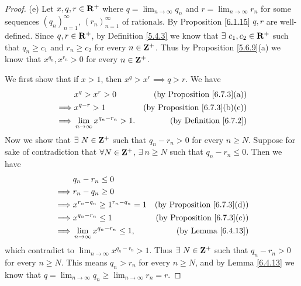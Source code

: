 \begin{proof}{(e)}
    Let \(x, q, r \in \mathbf{R}^+\) where \(q = \lim_{n \to \infty} q_n\) and \(r = \lim_{n \to \infty} r_n\) for some sequences \((q_n)_{n = 1}^\infty\), \((r_n)_{n = 1}^\infty\) of rationals.
    By Proposition \ref{6.1.15} \(q, r\) are well-defined.
    Since \(q, r \in \mathbf{R}^+\), by Definition \ref{5.4.3} we know that \(\exists\ c_1, c_2 \in \mathbf{R}^+\) such that \(q_n \geq c_1\) and \(r_n \geq c_2\) for every \(n \in \mathbf{Z}^+\).
    Thus by Proposition \ref{5.6.9}(a) we know that \(x^{q_n}, x^{r_n} > 0\) for every \(n \in \mathbf{Z}^+\).

    We first show that if \(x > 1\), then \(x^q > x^r \implies q > r\).
    We have
    \begin{align*}
                 & x^q > x^r > 0                          & \text{(by Proposition \ref{6.7.3}(a))}    \\
        \implies & x^{q - r} > 1                          & \text{(by Proposition \ref{6.7.3}(b)(c))} \\
        \implies & \lim_{n \to \infty} x^{q_n - r_n} > 1. & \text{(by Definition \ref{6.7.2})}        \\
    \end{align*}
    Now we show that \(\exists\ N \in \mathbf{Z}^+\) such that \(q_n - r_n > 0\) for every \(n \geq N\).
    Suppose for sake of contradiction that \(\forall N \in \mathbf{Z}^+\), \(\exists\ n \geq N\) such that \(q_n - r_n \leq 0\).
    Then we have
    \begin{align*}
                 & q_n - r_n \leq 0                                                                   \\
        \implies & r_n - q_n \geq 0                                                                   \\
        \implies & x^{r_n - q_n} \geq 1^{r_n - q_n} = 1      & \text{(by Proposition \ref{6.7.3}(d))} \\
        \implies & x^{q_n - r_n} \leq 1                      & \text{(by Proposition \ref{6.7.3}(c))} \\
        \implies & \lim_{n \to \infty} x^{q_n - r_n} \leq 1, & \text{(by Lemma \ref{6.4.13})}
    \end{align*}
    which contradict to \(\lim_{n \to \infty} x^{q_n - r_n} > 1\).
    Thus \(\exists\ N \in \mathbf{Z}^+\) such that \(q_n - r_n > 0\) for every \(n \geq N\).
    This means \(q_n > r_n\) for every \(n \geq N\), and by Lemma \ref{6.4.13} we know that \(q = \lim_{n \to \infty} q_n \geq \lim_{n \to \infty} r_n = r\).


\end{proof}
